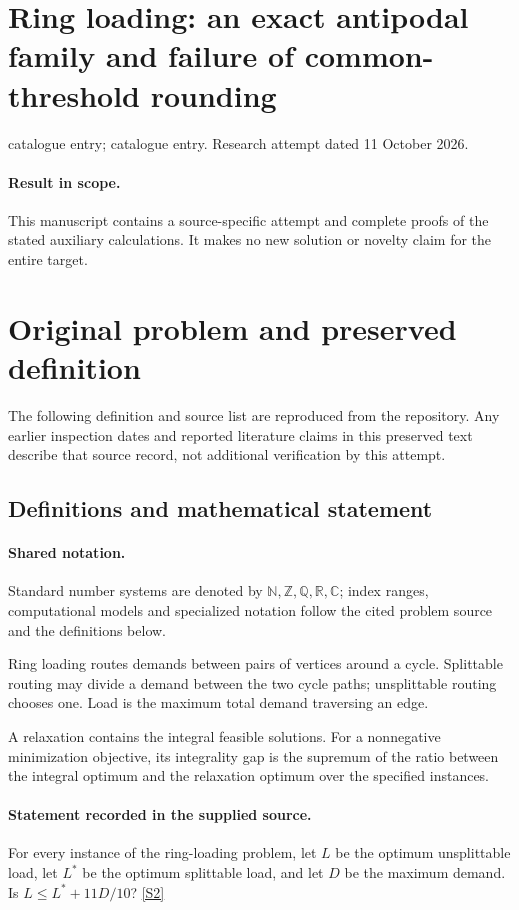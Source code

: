 \documentclass[11pt]{article}
\begin{document}
\section*{Ring loading: an exact antipodal family and failure of common-threshold rounding}
\noindent catalogue entry; catalogue entry. Research attempt dated 11 October 2026.
\paragraph{Result in scope.}This manuscript contains a source-specific attempt and complete proofs of the stated auxiliary calculations. It makes no new solution or novelty claim for the entire target.
\section{Original problem and preserved definition}
The following definition and source list are reproduced from the repository. Any earlier inspection dates and reported literature claims in this preserved text describe that source record, not additional verification by this attempt.
\subsection{Definitions and mathematical statement}

\paragraph{Shared notation.}Standard number systems are denoted by $\mathbb N,\mathbb Z,\mathbb Q,\mathbb R,\mathbb C$; index ranges, computational models and specialized notation follow the cited problem source and the definitions below.


Ring loading routes demands between pairs of vertices around a cycle. Splittable routing may divide a demand between the two cycle paths; unsplittable routing chooses one. Load is the maximum total demand traversing an edge.

A relaxation contains the integral feasible solutions. For a nonnegative minimization objective, its integrality gap is the supremum of the ratio between the integral optimum and the relaxation optimum over the specified instances.
\paragraph{Statement recorded in the supplied source.}
For every instance of the ring-loading problem, let $L$ be the optimum unsplittable load, let $L^*$ be the optimum splittable load, and let $D$ be the maximum demand. Is $L\leq L^*+11D/10$? \href{https://doi.org/10.4171/owr/2014/51}{[S2]}
\end{document}
